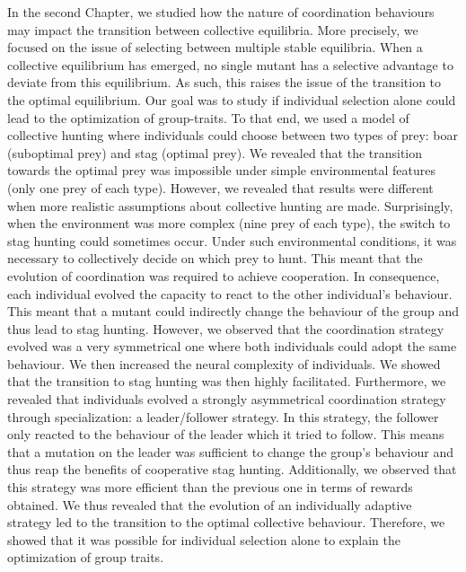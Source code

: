 		In the second Chapter, we studied how the nature of coordination behaviours may impact the transition between collective equilibria. More precisely, we focused on the issue of selecting between multiple stable equilibria. When a collective equilibrium has emerged, no single mutant has a selective advantage to deviate from this equilibrium. As such, this raises the issue of the transition to the optimal equilibrium. Our goal was to study if individual selection alone could lead to the optimization of group-traits. To that end, we used a model of collective hunting where individuals could choose between two types of prey: boar (suboptimal prey) and stag (optimal prey). We revealed that the transition towards the optimal prey was impossible under simple environmental features (only one prey of each type). However, we revealed that results were different when more realistic assumptions about collective hunting are made. Surprisingly, when the environment was more complex (nine prey of each type), the switch to stag hunting could sometimes occur. Under such environmental conditions, it was necessary to collectively decide on which prey to hunt. This meant that the evolution of coordination was required to achieve cooperation. In consequence, each individual evolved the capacity to react to the other individual's behaviour. This meant that a mutant could indirectly change the behaviour of the group and thus lead to stag hunting. However, we observed that the coordination strategy evolved was a very symmetrical one where both individuals could adopt the same behaviour. We then increased the neural complexity of individuals. We showed that the transition to stag hunting was then highly facilitated. Furthermore, we revealed that individuals evolved a strongly asymmetrical coordination strategy through specialization: a leader/follower strategy. In this strategy, the follower only reacted to the behaviour of the leader which it tried to follow. This means that a mutation on the leader was sufficient to change the group's behaviour and thus reap the benefits of cooperative stag hunting. Additionally, we observed that this strategy was more efficient than the previous one in terms of rewards obtained. We thus revealed that the evolution of an individually adaptive strategy led to the transition to the optimal collective behaviour. Therefore, we showed that it was possible for individual selection alone to explain the optimization of group traits.

